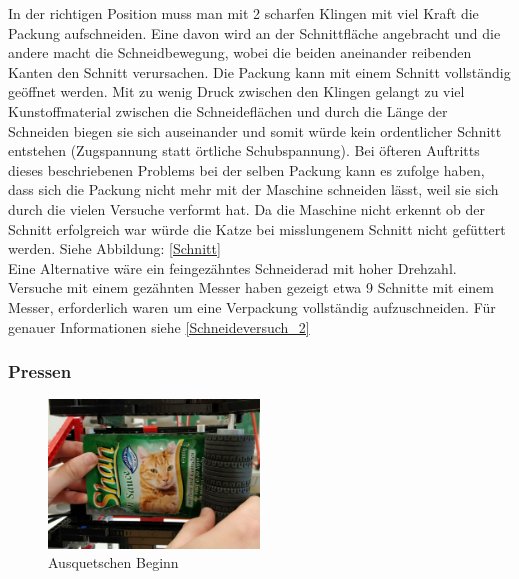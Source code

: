 In der richtigen Position muss man mit 2 scharfen Klingen mit viel Kraft die Packung aufschneiden. Eine davon wird an der Schnittfläche angebracht und die andere macht die Schneidbewegung, wobei die beiden aneinander reibenden Kanten den Schnitt verursachen. Die Packung kann mit einem Schnitt vollständig geöffnet werden. Mit zu wenig Druck zwischen den Klingen gelangt zu viel Kunstoffmaterial zwischen die Schneideflächen und durch die Länge der Schneiden biegen sie sich auseinander und somit würde  kein ordentlicher Schnitt entstehen (Zugspannung statt örtliche Schubspannung). Bei öfteren Auftritts dieses beschriebenen Problems bei der selben Packung kann es zufolge haben, dass sich die Packung nicht mehr mit der Maschine schneiden lässt, weil sie sich durch die vielen Versuche verformt hat. Da die Maschine nicht erkennt ob der Schnitt erfolgreich war würde die Katze bei misslungenem Schnitt nicht gefüttert werden. Siehe Abbildung: \ref{Schnitt} \\

Eine Alternative wäre ein feingezähntes Schneiderad mit hoher Drehzahl. Versuche mit einem gezähnten Messer haben gezeigt etwa 9 Schnitte mit einem Messer, erforderlich waren um eine Verpackung vollständig aufzuschneiden. Für genauer Informationen siehe \ref{Schneideversuch_2}


\subsubsection{Pressen}

\begin{figure}
\vspace{-30pt}
  \begin{center}
    \includegraphics[width=0.50\textwidth]{Bilder/Ablauf_1_png/Ausquetschen_1}
  \end{center}
  \caption{Ausquetschen Beginn}
  \label{Ausquetschen Beginn}
  \vspace{-10pt}
\end{figure}

